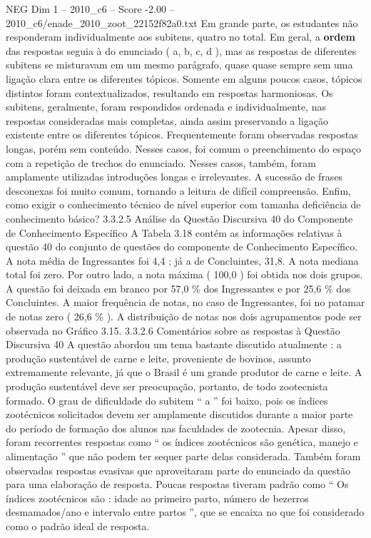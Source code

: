 \begin{textsample}{NEG Dim 1 – 2010\_c6 – Score -2.00 – 2010\_c6/enade\_2010\_zoot\_22152f82a0.txt}
Em grande parte, os estudantes não responderam individualmente aos subitens, quatro no total.
Em geral, a \textbf{ordem} das respostas seguia à do enunciado ( a, b, c, d ), mas as respostas de diferentes subitens se misturavam em um mesmo parágrafo, quase quase sempre sem uma ligação clara entre os diferentes tópicos.
Somente em alguns poucos casos, tópicos distintos foram contextualizados, resultando em respostas harmoniosas.
Os subitens, geralmente, foram respondidos ordenada e individualmente, nas respostas consideradas mais completas, ainda assim preservando a ligação existente entre os diferentes tópicos.
Frequentemente foram observadas respostas longas, porém sem conteúdo.
Nesses casos, foi comum o preenchimento do espaço com a repetição de trechos do enunciado.
Nesses casos, também, foram amplamente utilizadas introduções longas e irrelevantes.
A sucessão de frases desconexas foi muito comum, tornando a leitura de difícil compreensão.
Enfim, como exigir o conhecimento técnico de nível superior com tamanha deficiência de conhecimento básico? 3.3.2.5 Análise da Questão Discursiva 40 do Componente de Conhecimento Específico A Tabela 3.18 contém as informações relativas à questão 40 do conjunto de questões do componente de Conhecimento Específico.
A nota média de Ingressantes foi 4,4 ; já a de Concluintes, 31,8.
A nota mediana total foi zero.
Por outro lado, a nota máxima ( 100,0 ) foi obtida nos dois grupos.
A questão foi deixada em branco por 57,0 \% dos Ingressantes e por 25,6 \% dos Concluintes.
A maior frequência de notas, no caso de Ingressantes, foi no patamar de notas zero ( 26,6 \% ).
A distribuição de notas nos dois agrupamentos pode ser observada no Gráfico 3.15. 3.3.2.6 Comentários sobre as respostas à Questão Discursiva 40 A questão abordou um tema bastante discutido atualmente : a produção sustentável de carne e leite, proveniente de bovinos, assunto extremamente relevante, já que o Brasil é um grande produtor de carne e leite.
A produção sustentável deve ser preocupação, portanto, de todo zootecnista formado.
O grau de dificuldade do subitem “ a ” foi baixo, pois os índices zootécnicos solicitados devem ser amplamente discutidos durante a maior parte do período de formação dos alunos nas faculdades de zootecnia.
Apesar disso, foram recorrentes respostas como “ os índices zootécnicos são genética, manejo e alimentação ” que não podem ter sequer parte delas considerada.
Também foram observadas respostas evasivas que aproveitaram parte do enunciado da questão para uma elaboração de resposta.
Poucas respostas tiveram padrão como “ Os índices zootécnicos são : idade ao primeiro parto, número de bezerros desmamados/ano e intervalo entre partos ”, que se encaixa no que foi considerado como o padrão ideal de resposta.

\end{textsample}
